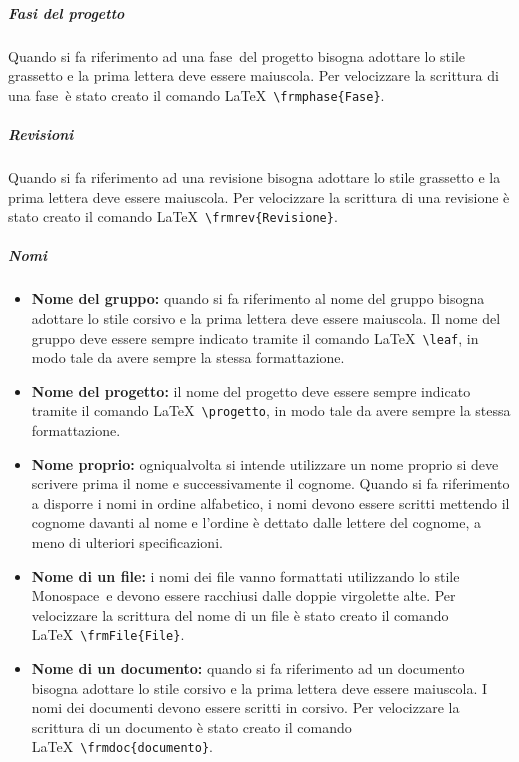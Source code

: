 \documentclass[../NormeProgetto.tex]{subfiles}
\begin{document}
			\subparagraph{Fasi del progetto}
				Quando si fa riferimento ad una fase\g\ del progetto bisogna adottare lo stile grassetto e la prima lettera deve essere maiuscola.	 Per velocizzare la scrittura di una fase\g\ è stato creato il comando \LaTeX\ \texttt{\textbackslash frmphase\{Fase\}}. 
			\subparagraph{Revisioni}
				Quando si fa riferimento ad una revisione bisogna adottare lo stile grassetto e la prima lettera deve essere maiuscola. Per velocizzare la scrittura di una revisione è stato creato il comando \LaTeX\ \texttt{\textbackslash frmrev\{Revisione\}}.
			

			\subparagraph{Nomi}
				\begin{itemize}
					\item \textbf{Nome del gruppo:} quando si fa riferimento al nome del gruppo bisogna adottare lo stile corsivo e la prima lettera deve essere maiuscola.	
					Il nome del gruppo deve essere sempre indicato tramite il comando \LaTeX\ \texttt{\textbackslash leaf}, in modo tale da avere sempre la stessa formattazione.
					\item \textbf{Nome del progetto:} il nome del progetto deve essere sempre indicato tramite il comando \LaTeX\ \texttt{\textbackslash progetto}, in modo tale da avere sempre la stessa formattazione.
					\item \textbf{Nome proprio:} ogniqualvolta si intende utilizzare un nome proprio si deve scrivere prima il nome e successivamente il cognome. Quando si fa riferimento a disporre i nomi in ordine alfabetico, i nomi devono essere scritti mettendo il cognome davanti al nome e l'ordine è dettato dalle lettere del cognome, a meno di ulteriori specificazioni.				
					\item \textbf{Nome di un file:} i nomi dei file vanno formattati utilizzando lo stile Monospace\g\ e devono essere racchiusi dalle doppie virgolette alte.  Per velocizzare la scrittura del nome di un file è stato creato il comando \LaTeX\ \texttt{\textbackslash frmFile\{File\}}.				
					\item \textbf{Nome di un documento:} quando si fa riferimento ad un documento bisogna adottare lo stile corsivo e la prima lettera deve essere maiuscola. I nomi dei documenti devono essere scritti in corsivo. Per velocizzare la scrittura di un documento è stato creato il comando \LaTeX\ \texttt{\textbackslash frmdoc\{documento\}}.				
				\end{itemize}
\end{document}
